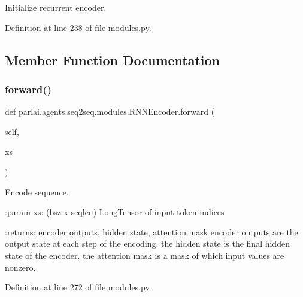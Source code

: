\begin{DoxyVerb}Initialize recurrent encoder.\end{DoxyVerb}
 

Definition at line 238 of file modules.\+py.



\subsection{Member Function Documentation}
\mbox{\label{classparlai_1_1agents_1_1seq2seq_1_1modules_1_1RNNEncoder_a4ae3d043b7a381e0eb89eb5460217029}} 
\subsubsection{\texorpdfstring{forward()}{forward()}}
{\footnotesize\ttfamily def parlai.\+agents.\+seq2seq.\+modules.\+R\+N\+N\+Encoder.\+forward (\begin{DoxyParamCaption}\item[{}]{self,  }\item[{}]{xs }\end{DoxyParamCaption})}

\begin{DoxyVerb}Encode sequence.

:param xs: (bsz x seqlen) LongTensor of input token indices

:returns: encoder outputs, hidden state, attention mask
    encoder outputs are the output state at each step of the encoding.
    the hidden state is the final hidden state of the encoder.
    the attention mask is a mask of which input values are nonzero.
\end{DoxyVerb}
 

Definition at line 272 of file modules.\+py.



